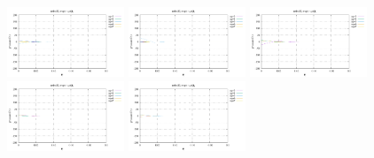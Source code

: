 \noindent
\includegraphics[width=3.5cm]{python_codes/fieldstone_152/RESULTS/exp1/qqq_64_m2}
\includegraphics[width=3.5cm]{python_codes/fieldstone_152/RESULTS/exp1/qqq_64_m3}
\includegraphics[width=3.5cm]{python_codes/fieldstone_152/RESULTS/exp1/qqq_64_m4}
\includegraphics[width=3.5cm]{python_codes/fieldstone_152/RESULTS/exp1/qqq_64_m5}
\includegraphics[width=3.5cm]{python_codes/fieldstone_152/RESULTS/exp1/qqq_64_m6}


